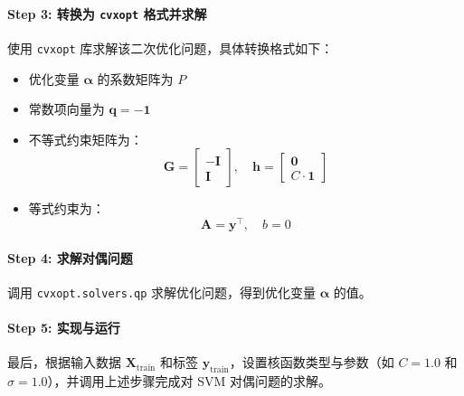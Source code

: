 \documentclass[12pt,a4paper,oneside]{article}
\begin{document}
\paragraph{Step 3: 转换为 \texttt{cvxopt} 格式并求解}
使用 \texttt{cvxopt} 库求解该二次优化问题，具体转换格式如下：
\begin{itemize}
    \item 优化变量 $\boldsymbol{\alpha}$ 的系数矩阵为 $P$
    \item 常数项向量为 $\mathbf{q} = -\mathbf{1}$
    \item 不等式约束矩阵为：
    \[
    \mathbf{G} = \begin{bmatrix}
    -\mathbf{I} \\ 
    \mathbf{I}
    \end{bmatrix}, \quad
    \mathbf{h} = \begin{bmatrix}
    \mathbf{0} \\ 
    C \cdot \mathbf{1}
    \end{bmatrix}
    \]
    \item 等式约束为：
    \[
    \mathbf{A} = \mathbf{y}^\top, \quad b = 0
    \]
\end{itemize}

\paragraph{Step 4: 求解对偶问题}
调用 \texttt{cvxopt.solvers.qp} 求解优化问题，得到优化变量 $\boldsymbol{\alpha}$ 的值。

\paragraph{Step 5: 实现与运行}
最后，根据输入数据 $\mathbf{X}_{\text{train}}$ 和标签 $\mathbf{y}_{\text{train}}$，设置核函数类型与参数（如 $C=1.0$ 和 $\sigma=1.0$），并调用上述步骤完成对 SVM 对偶问题的求解。
\end{document}

